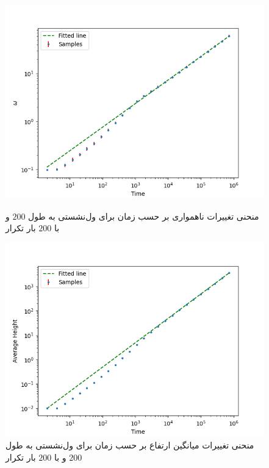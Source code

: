 \documentclass[11pt, a4paper]{article}
\begin{document}
\begin{figure}[h]
	\centering
  \begin{minipage}[b]{0.48\textwidth}
    \includegraphics[width=\textwidth]{q4_200_200_1_14_.5_omega.png}
    \caption{منحنی تغییرات ناهمواری بر حسب زمان برای ول‌نشستی به طول $200$ و با $200$ بار تکرار}
    \label{fig:q4_200_200_omega}
  \end{minipage}
  \hfill
  \begin{minipage}[b]{0.48\textwidth}
    \includegraphics[width=\textwidth]{q4_200_200_1_14_.5_avg.png}
    \caption{منحنی تغییرات میانگین ارتفاع بر حسب زمان برای ول‌نشستی به طول $200$ و با $200$ بار تکرار}
    \label{fig:q4_200_200_avg}
  \end{minipage}
\end{figure}
\end{document}
